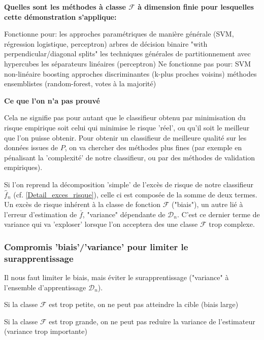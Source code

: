 \documentclass[a4paper]{article}
\theoremstyle{plain}
\begin{document}
\textbf{Quelles sont les méthodes à classe $\mathcal{F}$ à dimension finie pour lesquelles cette démonstration s'applique:}
\begin{outline}
\1 Fonctionne pour:
\2 les approches paramétriques de manière générale (SVM, régression logistique, perceptron)
\2 arbres de décision binaire "with perpendicular/diagonal splits"
\2 les techniques générales de partitionnement avec hypercubes 
\2 les séparateurs linéaires (perceptron)
\1 Ne fonctionne pas pour:
\2 SVM non-linéaire
\2 boosting
\2 approches discriminantes (k-plus proches voisins)
\2 méthodes ensemblistes (random-forest, votes à la majorité)
\end{outline}


\textbf{Ce que l'on n'a pas prouvé} 

Cela ne signifie pas pour autant que le classifieur obtenu par minimisation du risque empirique soit celui qui minimise le risque 'réel', ou qu'il soit le meilleur que l'on puisse obtenir. Pour obtenir un classifieur de meilleure qualité sur les données issues de $P$, on va chercher des méthodes plus fines (par exemple en pénalisant la 'complexité' de notre classifieur, ou par des méthodes de validation empiriques).

Si l'on reprend la décomposition 'simple' de l'excès de risque de notre classifieur $\hat f_n$ (cf. \ref{Detail_exces_risque}), celle ci est composée de la somme de deux termes. Un excès de risque inhérent à la classe de fonction $\mathcal{F}$ ("biais"), un autre lié à l'erreur d'estimation de $\bar f$, "variance" dépendante de $\mathcal{D}_n$. C'est ce dernier terme de variance qui va 'exploser' lorsque l'on acceptera des une classe $\mathcal{F}$ trop complexe.\\


\subsubsection{Compromis 'biais'/'variance' pour limiter le surapprentissage}
Il nous faut limiter le biais, mais éviter le surapprentissage ("variance" à l'ensemble d'apprentissage $\mathcal{D}_n$).

\begin{outline}

\1 Si la classe $\mathcal{F}$ est trop petite, on ne peut pas atteindre la cible (biais large)

\1 Si la classe $\mathcal{F}$ est trop grande, on ne peut pas reduire la variance de l'estimateur (variance trop importante)
\end{outline}
\end{document}
